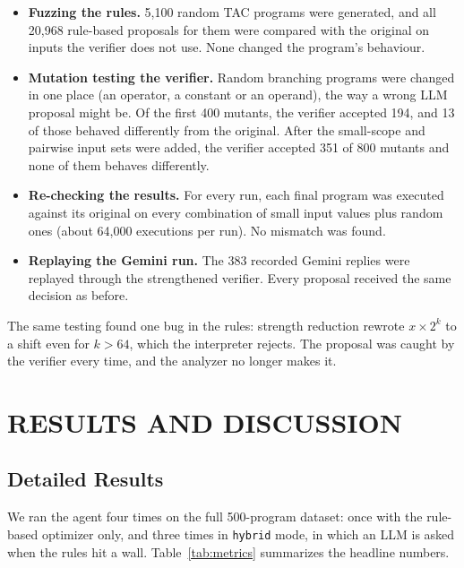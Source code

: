 \documentclass[12pt,a4paper]{report}
\begin{document}
\begin{itemize}[leftmargin=2cm]
  \item \textbf{Fuzzing the rules.} 5,100 random TAC programs were generated, and all 20,968 rule-based proposals for them were compared with the original on inputs the verifier does not use. None changed the program's behaviour.
  \item \textbf{Mutation testing the verifier.} Random branching programs were changed in one place (an operator, a constant or an operand), the way a wrong LLM proposal might be. Of the first 400 mutants, the verifier accepted 194, and 13 of those behaved differently from the original. After the small-scope and pairwise input sets were added, the verifier accepted 351 of 800 mutants and none of them behaves differently.
  \item \textbf{Re-checking the results.} For every run, each final program was executed against its original on every combination of small input values plus random ones (about 64,000 executions per run). No mismatch was found.
  \item \textbf{Replaying the Gemini run.} The 383 recorded Gemini replies were replayed through the strengthened verifier. Every proposal received the same decision as before.
\end{itemize}

The same testing found one bug in the rules: strength reduction rewrote $x \times 2^k$ to a shift even for $k > 64$, which the interpreter rejects. The proposal was caught by the verifier every time, and the analyzer no longer makes it.


\chapter{RESULTS AND DISCUSSION}

\section{Detailed Results}

We ran the agent four times on the full 500-program dataset: once with the rule-based optimizer only, and three times in \texttt{hybrid} mode, in which an LLM is asked when the rules hit a wall. Table~\ref{tab:metrics} summarizes the headline numbers.
\end{document}

